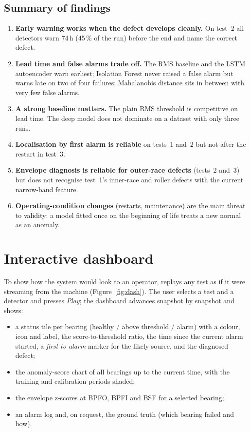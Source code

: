 \documentclass[11pt]{article}
\begin{document}
\subsection{Summary of findings}
\begin{enumerate}
  \item \textbf{Early warning works when the defect develops cleanly.} On test~2 all detectors warn
        74\,h (45\,\% of the run) before the end and name the correct defect.
  \item \textbf{Lead time and false alarms trade off.} The RMS baseline and the LSTM autoencoder warn
        earliest; Isolation Forest never raised a false alarm but warns late on two of four failures;
        Mahalanobis distance sits in between with very few false alarms.
  \item \textbf{A strong baseline matters.} The plain RMS threshold is competitive on lead time. The
        deep model does not dominate on a dataset with only three runs.
  \item \textbf{Localisation by first alarm is reliable} on tests~1 and~2 but not after the restart in
        test~3.
  \item \textbf{Envelope diagnosis is reliable for outer-race defects} (tests~2 and~3) but does not
        recognise test~1's inner-race and roller defects with the current narrow-band feature.
  \item \textbf{Operating-condition changes} (restarts, maintenance) are the main threat to
        validity: a model fitted once on the beginning of life treats a new normal as an anomaly.
\end{enumerate}

\section{Interactive dashboard}
To show how the system would look to an operator,  replays any test as if it
were streaming from the machine (Figure~\ref{fig:dash}). The user selects a test and a detector and
presses \emph{Play}; the dashboard advances snapshot by snapshot and shows:
\begin{itemize}
  \item a status tile per bearing (healthy / above threshold / alarm) with a colour, icon and label,
        the score-to-threshold ratio, the time since the current alarm started, a
        \emph{first to alarm} marker for the likely source, and the diagnosed defect;
  \item the anomaly-score chart of all bearings up to the current time, with the training and
        calibration periods shaded;
  \item the envelope z-scores at BPFO, BPFI and BSF for a selected bearing;
  \item an alarm log and, on request, the ground truth (which bearing failed and how).
\end{itemize}
\end{document}
